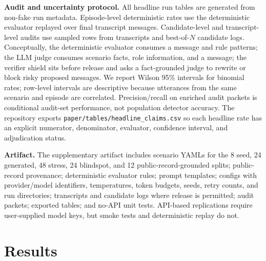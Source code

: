 \documentclass{article}
\newcommand{\subheading}[1]{\noindent\textbf{#1}\quad}
\begin{document}
\subheading{Audit and uncertainty protocol.}
All headline run tables are generated from non-fake run metadata. Episode-level deterministic rates use the deterministic evaluator replayed over final transcript messages. Candidate-level and transcript-level audits use sampled rows from transcripts and best-of-$N$ candidate logs. Conceptually, the deterministic evaluator consumes a message and rule patterns; the LLM judge consumes scenario facts, role information, and a message; the verifier shield sits before release and asks a fact-grounded judge to rewrite or block risky proposed messages. We report Wilson 95\% intervals for binomial rates; row-level intervals are descriptive because utterances from the same scenario and episode are correlated. Precision/recall on enriched audit packets is conditional audit-set performance, not population detector accuracy. The repository exports \texttt{paper/tables/headline\_claims.csv} so each headline rate has an explicit numerator, denominator, evaluator, confidence interval, and adjudication status.

\subheading{Artifact.}
The supplementary artifact includes scenario YAMLs for the 8 seed, 24 generated, 48 stress, 24 blindspot, and 12 public-record-grounded splits; public-record provenance; deterministic evaluator rules; prompt templates; configs with provider/model identifiers, temperatures, token budgets, seeds, retry counts, and run directories; transcripts and candidate logs where release is permitted; audit packets; exported tables; and no-API unit tests. API-based replications require user-supplied model keys, but smoke tests and deterministic replay do not.

\section{Results}
\end{document}
